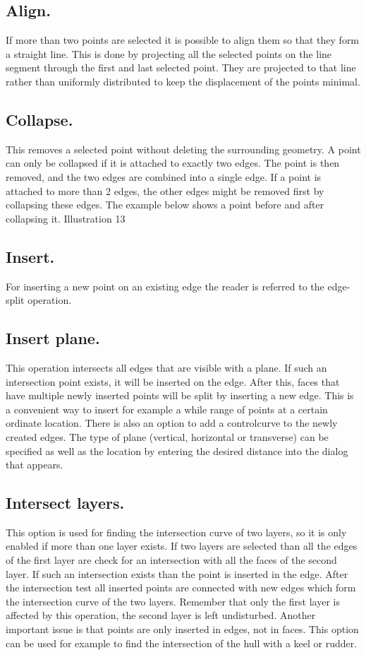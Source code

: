 \documentclass[12pt]{article}
\begin{document}
\subsection{Align.}
If more than two points are selected it is possible to align them so that they form a straight line. This
is done by projecting all the selected points on the line segment through the first and last selected
point. They are projected to that line rather than uniformly distributed to keep the displacement of
the points minimal.

\subsection{Collapse.} \label{point-collapse}
This removes a selected point without deleting the surrounding geometry. A point can only be
collapsed if it is attached to exactly two edges. The point is then removed, and the two edges are
combined into a single edge. If a point is attached to more than 2 edges, the other edges might be
removed first by collapsing these edges. The example below shows a point before and after
collapsing it.
Illustration 13

\subsection{Insert.}
For inserting a new point on an existing edge the reader is referred to the edge-split operation.

\subsection{Insert plane.}
This operation intersects all edges that are visible with a plane. If such an intersection point exists,
it will be inserted on the edge. After this, faces that have multiple newly inserted points will be split
by inserting a new edge. This is a convenient way to insert for example a while range of points at a
certain ordinate location. There is also an option to add a controlcurve to the newly created edges.
The type of plane (vertical, horizontal or transverse) can be specified as well as the location by
entering the desired distance into the dialog that appears.

\subsection{Intersect layers.}
This option is used for finding the intersection curve of two layers, so it is only enabled if more than
one layer exists. If two layers are selected than all the edges of the first layer are check for an
intersection with all the faces of the second layer. If such an intersection exists than the point is
inserted in the edge. After the intersection test all inserted points are connected with new edges
which form the intersection curve of the two layers. Remember that only the first layer is affected by
this operation, the second layer is left undisturbed. Another important issue is that points are only
inserted in edges, not in faces. This option can be used for example to find the intersection of the
hull with a keel or rudder.
\end{document}
